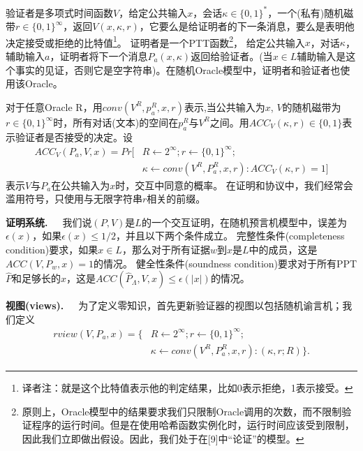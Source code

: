 \documentclass[]{article}
\begin{document}
    
    验证者是多项式时间函数$V$，给定公共输入$x$，会话$\kappa \in \{0,1\}^*$，一个(私有)随机磁带$r\in \{0,1\}^\infty$，返回$V(x,\kappa,r)$，它要么是给证明者的下一条消息，要么是表明他决定接受或拒绝的比特值\footnote{译者注：就是这个比特值表示他的判定结果，比如0表示拒绝，1表示接受。}。
    证明者是一个PTT函数\footnote{原则上，Oracle模型中的结果要求我们只限制Oracle调用的次数，而不限制验证程序的运行时间。但是在使用哈希函数实例化时，运行时间应该受到限制，因此我们立即做出假设。因此，我们处于在[9]中“论证”的模型。}，
    给定公共输入$x$，对话$\kappa$，辅助输入$a$，证明者将下一个消息$P_a(x,\kappa)$返回给验证者。(当$x\in L$辅助输入是这个事实的见证，否则它是空字符串)。在随机Oracle模型中，证明者和验证者也使用该Oracle。
    
    
    对于任意Oracle R，用$conv(V^R,p_a^R,x,r)$表示,当公共输入为$x$, $V$的随机磁带为$r\in \{0,1\}^\infty$时，所有对话(文本)的空间在$p_a^R$与$V^R$之间。用$ACC_V(\kappa,r)\in \{0,1\}$表示验证者是否接受的决定。设
    \begin{align*}
    	ACC_V(P_a,V,x)=Pr[&R\leftarrow 2^\infty;r\leftarrow \{0,1\}^\infty;\\
    	                  &\kappa \leftarrow conv(V^R,P_a^R,x,r):ACC_V(\kappa,r)=1]
    \end{align*}
    表示$V$与$P_a$在公共输入为$x$时，交互中同意的概率。
    在证明和协议中，我们经常会滥用符号，只使用与无限字符串$r$相关的前缀。
    
    
    \textbf{证明系统.}\ \ \ 
    我们说$(P,V)$是$L$的一个交互证明，在随机预言机模型中，误差为$\epsilon (x)$，如果$\epsilon (x) \leq 1/2$，并且以下两个条件成立。
    完整性条件(completeness condition)要求，如果$x\in L$，那么对于所有证据$w$到$x$是$L$中的成员，这是$ACC(V,P_w,x)=1$的情况。
    健全性条件(soundness condition)要求对于所有PPT $\hat{P}$和足够长的$x$，这是$ACC(\hat{P}_\Lambda,V,x)\leq \epsilon (|x|)$的情况。
    
    
    \textbf{视图(views).}\ \ \ 
    为了定义零知识，首先更新验证器的视图以包括随机谕言机；我们定义
    \begin{align*}
    	rview(V,P_a,x)=\{&R\leftarrow 2^\infty;r\leftarrow\{0,1\}^\infty;\\
    	                 &\kappa \leftarrow conv(V^R,P_a^R,x,r):(\kappa,r;R)\}.
    \end{align*}
    
\end{document}
